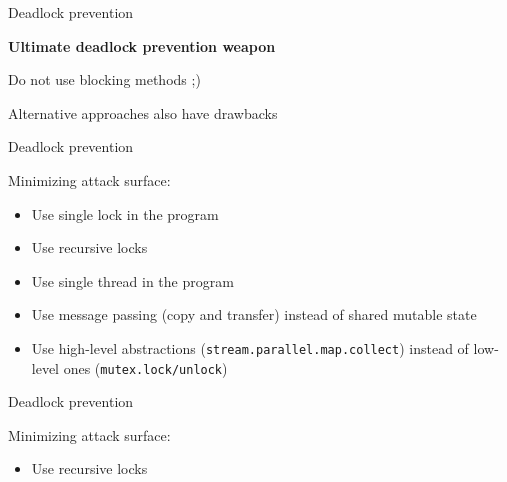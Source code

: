 \begin{frame}{Deadlock prevention}

\textbf{Ultimate deadlock prevention weapon}

\pause

Do not use blocking methods ;)

\pause

Alternative approaches also have drawbacks

\end{frame}

\begin{frame}[t,noframenumbering]{Deadlock prevention}

Minimizing attack surface:
\begin{itemize}    
    \item Use single lock in the program
    \pause
    \item Use recursive locks
    \pause
    \item Use single thread in the program    
    \pause
    \item Use message passing (copy and transfer) instead of shared mutable state
    \pause
    \item Use high-level abstractions (\texttt{stream.parallel.map.collect}) instead of low-level ones (\texttt{mutex.lock/unlock})
\end{itemize}

\end{frame}

\begin{frame}[t,noframenumbering]{Deadlock prevention}

Minimizing attack surface:
\begin{itemize}
    \item Use recursive locks
\end{itemize}

\end{frame}


